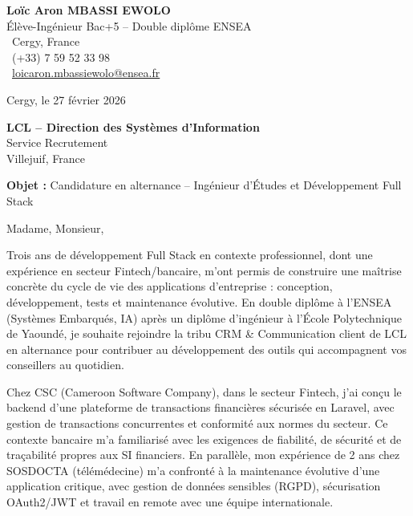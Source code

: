 \documentclass[a4paper,11pt]{article}
\begin{document}
\noindent
\begin{minipage}[t]{0.5\textwidth}
    \textbf{Loïc Aron MBASSI EWOLO}\\
    Élève-Ingénieur Bac+5 -- Double diplôme ENSEA\\[3pt]
    \faMapMarker\ Cergy, France\\
    \faPhone\ (+33) 7 59 52 33 98\\
    \faEnvelope\ \href{mailto:loicaron.mbassiewolo@ensea.fr}{loicaron.mbassiewolo@ensea.fr}
\end{minipage}
\hfill
\begin{minipage}[t]{0.4\textwidth}
    \raggedleft
    Cergy, le 27 février 2026
\end{minipage}

\vspace{1.2cm}

\hfill
\begin{minipage}[t]{0.5\textwidth}
    \raggedleft
    \textbf{LCL -- Direction des Systèmes d'Information}\\
    Service Recrutement\\
    Villejuif, France
\end{minipage}

\vspace{1cm}

\noindent\textbf{Objet :} Candidature en alternance -- Ingénieur d'Études et Développement Full Stack

\vspace{0.8cm}

Madame, Monsieur,

Trois ans de développement Full Stack en contexte professionnel, dont une expérience en secteur Fintech/bancaire, m'ont permis de construire une maîtrise concrète du cycle de vie des applications d'entreprise : conception, développement, tests et maintenance évolutive. En double diplôme à l'ENSEA (Systèmes Embarqués, IA) après un diplôme d'ingénieur à l'École Polytechnique de Yaoundé, je souhaite rejoindre la tribu CRM \& Communication client de LCL en alternance pour contribuer au développement des outils qui accompagnent vos conseillers au quotidien.

Chez CSC (Cameroon Software Company), dans le secteur Fintech, j'ai conçu le backend d'une plateforme de transactions financières sécurisée en Laravel, avec gestion de transactions concurrentes et conformité aux normes du secteur. Ce contexte bancaire m'a familiarisé avec les exigences de fiabilité, de sécurité et de traçabilité propres aux SI financiers. En parallèle, mon expérience de 2 ans chez SOSDOCTA (télémédecine) m'a confronté à la maintenance évolutive d'une application critique, avec gestion de données sensibles (RGPD), sécurisation OAuth2/JWT et travail en remote avec une équipe internationale.
\end{document}
